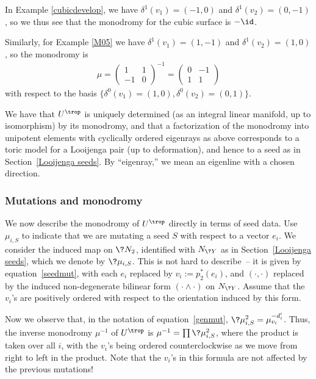 \begin{eg}In Example \ref{cubicdevelop}, we have $\delta^1(v_1) = (-1,0)$ and $\delta^1(v_2) = (0,-1)$, so we thus see that the monodromy for the cubic surface is $-\id$.
\end{eg}

\begin{eg} \label{M05 mono}Similarly, for Example \ref{M05} we have $\delta^1(v_1) = (1,-1)$ and $\delta^1(v_2) = (1,0)$, so the monodromy is
\begin{gather*}
	\mu= \left(\begin{matrix}
		1 &1 \\
		-1 &0
		\end{matrix}\right)^{-1} =
		\left(\begin{matrix}
		0 &-1 \\
		1 &1
		\end{matrix}\right)
\end{gather*}
with respect to the basis $\big\{ \delta^0(v_1) = (1,0) , \delta^0(v_2) = (0,1) \big\}$.
\end{eg}

We have that $U^{\trop}$ is uniquely determined (as an integral linear manifold, up to isomorphism)
 by its monodromy, and that a factorization of the monodromy into unipotent elements with cyclically ordered eigenrays as above corresponds to a toric model for a Looijenga pair (up to deformation), and hence to a seed as in Section~\ref{Looijenga seeds}. By ``eigenray,'' we mean an eigenline with a chosen direction.

\subsubsection{Mutations and monodromy}\label{mutmono}

We now describe the monodromy of $U^{\trop}$ directly in terms of seed data. Use $\mu_{i,S}$ to indicate that we are mutating a seed $S$ with respect to a vector $e_i$. We consider the induced map on $\?{N_2}$, identified with $N_{\?{Y}}$ as in Section~\ref{Looijenga seeds}, which we denote by $\?{\mu}_{i,S}$. This is not hard to describe~-- it is given by equation~\eqref{seedmut}, with each $e_i$ replaced by $v_i:=p_2^*(e_i)$, and $(\cdot,\cdot)$ replaced by the induced non-degenerate bilinear form $(\cdot\wedge\cdot)$ on $N_{\?{Y}}$.
 Assume that the $v_i$'s are positively ordered with respect to the orientation induced by this form.

Now we observe that, in the notation of equation~\eqref{genmut}, $\?{\mu}_{i,S}^2=\mu_{v_i}^{-d_i'}$. Thus, the inverse monodromy $\mu^{-1}$ of $U^{\trop}$ is $\mu^{-1}= \prod \?{\mu}_{i,S}^2$, where the product is taken over all $i$, with the $v_i$'s being ordered counterclockwise as we move from right to left in the product. Note that the $v_i$'s in this formula are not affected by the previous mutations!

